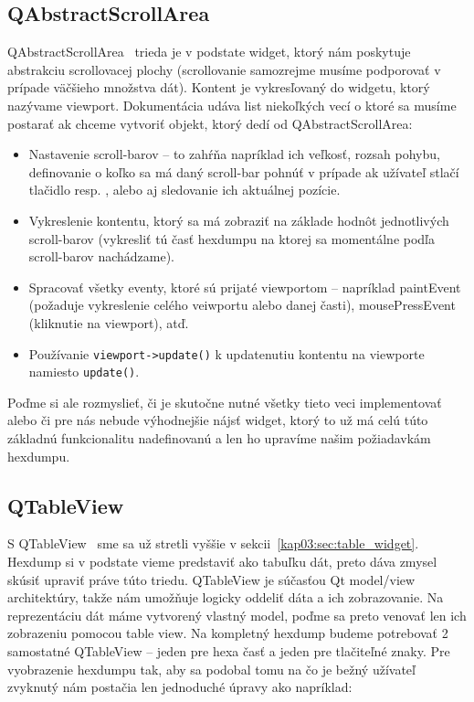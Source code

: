 \subsection*{QAbstractScrollArea}
QAbstractScrollArea~\cite{qabstractscrollarea} trieda je v podstate widget, ktorý nám poskytuje abstrakciu scrollovacej plochy (scrollovanie samozrejme musíme podporovať v prípade väčšieho množstva dát). Kontent je vykresľovaný do widgetu, ktorý nazývame viewport. Dokumentácia udáva list niekoľkých vecí o ktoré sa musíme postarať ak chceme vytvoriť objekt, ktorý dedí od QAbstractScrollArea:
\begin{itemize}
\item Nastavenie scroll-barov -- to zahŕňa napríklad ich veľkosť, rozsah pohybu, definovanie o koľko sa má daný scroll-bar pohnúť v prípade ak užívateľ stlačí tlačidlo  resp. , alebo aj sledovanie ich aktuálnej pozície.
\item Vykreslenie kontentu, ktorý sa má zobraziť na základe hodnôt jednotlivých scroll-barov (vykresliť tú časť hexdumpu na ktorej sa momentálne podľa scroll-barov nachádzame).
\item Spracovať všetky eventy, ktoré sú prijaté viewportom -- napríklad paintEvent (požaduje vykreslenie celého veiwportu alebo danej časti), mousePressEvent (kliknutie na viewport), atď.
\item Používanie \texttt{viewport->update()} k updatenutiu kontentu na viewporte namiesto \texttt{update()}.
\end{itemize}

Poďme si ale rozmyslieť, či je skutočne nutné všetky tieto veci implementovať alebo či pre nás nebude výhodnejšie nájsť widget, ktorý to už má celú túto základnú funkcionalitu nadefinovanú a len ho upravíme našim požiadavkám hexdumpu.

\subsection*{QTableView}
S QTableView~\cite{qtableview} sme sa už stretli vyššie v sekcii~\ref{kap03:sec:table_widget}. Hexdump si v podstate vieme predstaviť ako tabuľku dát, preto dáva zmysel skúsiť upraviť práve túto triedu. QTableView je súčasťou Qt model/view architektúry, takže nám umožňuje logicky oddeliť dáta a ich zobrazovanie. Na reprezentáciu dát máme vytvorený vlastný model, poďme sa preto venovať len ich zobrazeniu pomocou table view. Na kompletný hexdump budeme potrebovať 2 samostatné QTableView -- jeden pre hexa časť a jeden pre tlačiteľné znaky. Pre vyobrazenie hexdumpu tak, aby sa podobal tomu na čo je bežný užívateľ zvyknutý nám postačia len jednoduché úpravy ako napríklad:

